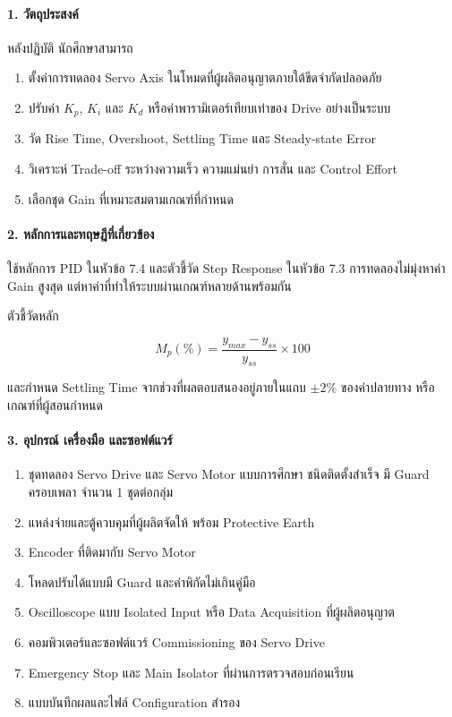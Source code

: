 \paragraph{1. วัตถุประสงค์}

หลังปฏิบัติ นักศึกษาสามารถ

\begin{enumerate}
    \item ตั้งค่าการทดลอง Servo Axis ในโหมดที่ผู้ผลิตอนุญาตภายใต้ขีดจำกัดปลอดภัย
    \item ปรับค่า $K_p$, $K_i$ และ $K_d$ หรือค่าพารามิเตอร์เทียบเท่าของ Drive อย่างเป็นระบบ
    \item วัด Rise Time, Overshoot, Settling Time และ Steady-state Error
    \item วิเคราะห์ Trade-off ระหว่างความเร็ว ความแม่นยำ การสั่น และ Control Effort
    \item เลือกชุด Gain ที่เหมาะสมตามเกณฑ์ที่กำหนด
\end{enumerate}

\paragraph{2. หลักการและทฤษฎีที่เกี่ยวข้อง}

ใช้หลักการ PID ในหัวข้อ 7.4 และตัวชี้วัด Step Response ในหัวข้อ 7.3 การทดลองไม่มุ่งหาค่า Gain สูงสุด แต่หาค่าที่ทำให้ระบบผ่านเกณฑ์หลายด้านพร้อมกัน

ตัวชี้วัดหลัก

\[
M_p(\%)=\frac{y_{max}-y_{ss}}{y_{ss}}\times100
\]

และกำหนด Settling Time จากช่วงที่ผลตอบสนองอยู่ภายในแถบ $\pm2\%$ ของค่าปลายทาง หรือเกณฑ์ที่ผู้สอนกำหนด

\paragraph{3. อุปกรณ์ เครื่องมือ และซอฟต์แวร์}

\begin{enumerate}
    \item ชุดทดลอง Servo Drive และ Servo Motor แบบการศึกษา ชนิดติดตั้งสำเร็จ มี Guard ครอบเพลา จำนวน 1 ชุดต่อกลุ่ม
    \item แหล่งจ่ายและตู้ควบคุมที่ผู้ผลิตจัดให้ พร้อม Protective Earth
    \item Encoder ที่ติดมากับ Servo Motor
    \item โหลดปรับได้แบบมี Guard และค่าพิกัดไม่เกินคู่มือ
    \item Oscilloscope แบบ Isolated Input หรือ Data Acquisition ที่ผู้ผลิตอนุญาต
    \item คอมพิวเตอร์และซอฟต์แวร์ Commissioning ของ Servo Drive
    \item Emergency Stop และ Main Isolator ที่ผ่านการตรวจสอบก่อนเรียน
    \item แบบบันทึกผลและไฟล์ Configuration สำรอง
\end{enumerate}

